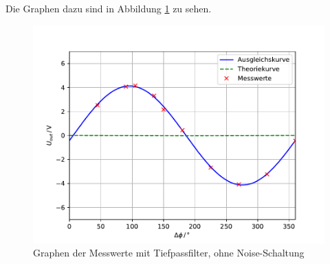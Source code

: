 Die Graphen dazu sind in Abbildung \ref{fig:U2} zu sehen.
\begin{figure}
\centering
\includegraphics[scale=0.5]{content/images/plot.pdf}
\caption{Graphen der Messwerte mit Tiefpassfilter, ohne Noise-Schaltung}
\label{fig:U2}
\end{figure}
